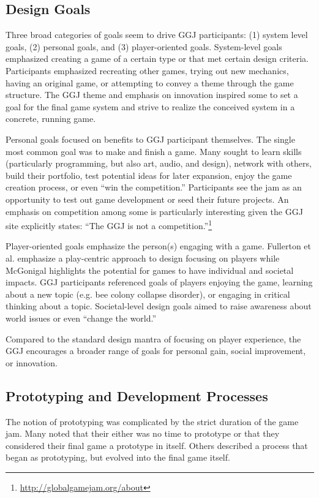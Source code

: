 \documentclass{sig-alternate}
\begin{document}
\subsection{Design Goals}
Three broad categories of goals seem to drive GGJ participants: (1) system level goals, (2) personal goals, and (3) player-oriented goals.
System-level goals emphasized creating a game of a certain type or that met certain design criteria. Participants emphasized recreating other games, trying out new mechanics, having an original game, or attempting to convey a theme through the game structure. The GGJ theme and emphasis on innovation inspired some to set a goal for the final game system and strive to realize the conceived system in a concrete, running game.

Personal goals focused on benefits to GGJ participant themselves. 
The single most common goal  was to make and finish a game. 
Many sought to learn skills (particularly programming, but also art, audio, and design), network with others, build their portfolio, test potential ideas for later expansion, enjoy the game creation process, or even ``win the competition.'' Participants see the jam as an opportunity to test out game development or seed their future projects. An emphasis on competition among some is particularly interesting given the GGJ site explicitly states: ``The GGJ is not a competition.''\footnote{\url{http://globalgamejam.org/about}}

Player-oriented goals emphasize the person(s) engaging with a game. Fullerton et al. \cite{fullerton2008:playcentric} emphasize a play-centric approach to design focusing on players while McGonigal \cite{mcgonigal2011:realitybroken} highlights the potential for games to have individual and societal impacts.
GGJ participants referenced goals of players enjoying the game, learning about a new topic (e.g. bee colony collapse disorder), or engaging in critical thinking about a topic. Societal-level design goals aimed to raise awareness about world issues or even ``change the world.''

Compared to the standard design mantra of focusing on player experience, the GGJ encourages a broader range of goals for personal gain, social improvement, or innovation. 


\subsection{Prototyping and Development Processes}
The notion of prototyping was complicated by the strict duration of the game jam. Many noted that their either was no time to prototype or that they considered their final game a prototype in itself. Others described a process that began as prototyping, but evolved into the final game itself.
\end{document}
